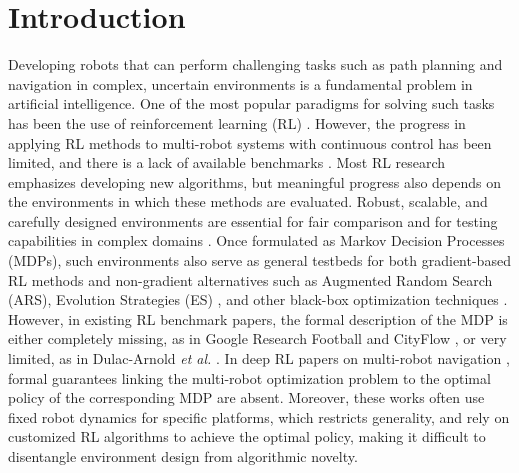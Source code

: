 \documentclass{article}
\begin{document}
\section{Introduction}
\label{sec:intro}
Developing robots that can perform challenging tasks such as path planning and navigation in complex, uncertain environments is a fundamental problem in artificial intelligence. One of the most popular paradigms for solving such tasks has been the use of reinforcement learning (RL) \cite{chen2017icra, everett2018iros, long2017iral, fan2020ijrr, han2022iral}. However, the progress in applying RL methods to multi-robot systems with continuous control has been limited, and there is a lack of available benchmarks \cite{brockman2016openai, islam2017reproducibility, mania2018ars, dulacArnold2021}. Most RL research emphasizes developing new algorithms, but meaningful progress also depends on the environments in which these methods are evaluated. Robust, scalable, and carefully designed environments are essential for fair comparison and for testing capabilities in complex domains \cite{dulacArnold2021, sutton2018reinforcement}. Once formulated as Markov Decision Processes (MDPs), such environments also serve as general testbeds for both gradient-based RL methods and non-gradient alternatives such as Augmented Random Search (ARS)\cite{mania2018ars}, Evolution Strategies (ES) \cite{salimans2017}, and other black-box optimization techniques \cite{risi2015neuroevolution}. However, in existing RL benchmark papers, the formal description of the MDP is either completely missing, as in Google Research Football \cite{kurach2020google} and CityFlow \cite{zhang2019cityflow}, or very limited, as in Dulac-Arnold \textit{et al.} \cite{dulacArnold2021}. In deep RL papers on multi-robot navigation \cite{chen2017icra, everett2018iros, long2017iral, fan2020ijrr, han2022iral}, formal guarantees linking the multi-robot optimization problem to the optimal policy of the corresponding MDP are absent. Moreover, these works often use fixed robot dynamics for specific platforms, which restricts generality, and rely on customized RL algorithms to achieve the optimal policy, making it difficult to disentangle environment design from algorithmic novelty.
\end{document}
